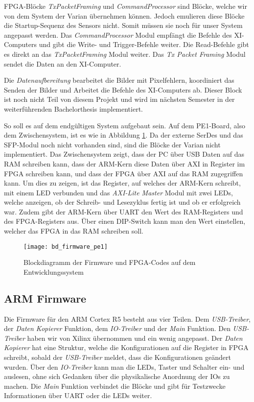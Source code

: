 FPGA-Blöcke \textit{TxPacketFraming} und \textit{CommandProcessor} sind Blöcke, welche wir von dem System der Varian übernehmen können. Jedoch emulieren diese Blöcke die Startup-Sequenz des Sensors nicht. Somit müssen sie noch für unser System angepasst werden. Das \textit{CommandProcessor} Modul empfängt die Befehle des XI-Computers und gibt die Write- und Trigger-Befehle weiter. Die Read-Befehle gibt es direkt an das \textit{TxPacketFraming} Modul weiter. 
Das \textit{Tx Packet Framing} Modul sendet die Daten an den XI-Computer.

Die \textit{Datenaufbereitung} bearbeitet die Bilder mit Pixelfehlern, koordiniert das Senden der Bilder und Arbeitet die Befehle des XI-Computers ab. Dieser Block ist noch nicht Teil von diesem Projekt und wird im nächsten Semester in der weiterführenden Bachelorthesis implementiert.

So soll es auf dem endgültigen System aufgebaut sein. Auf dem PE1-Board, also dem Zwischensystem, ist es wie in Abbildung \ref{fig:bd_firmware_pe1}. Da der externe SerDes und das SFP-Modul noch nicht vorhanden sind, sind die Blöcke der Varian nicht implementiert. Das Zwischensystem zeigt, dass der PC über USB Daten auf das RAM schreiben kann, dass der ARM-Kern diese Daten über AXI in Register im FPGA schreiben kann, und dass der FPGA über AXI auf das RAM zugegriffen kann. Um dies zu zeigen, ist das Register, auf welches der ARM-Kern schreibt, mit einem LED verbunden und das \textit{AXI-Lite Master} Modul mit zwei LEDs, welche anzeigen, ob der Schreib- und Lesezyklus fertig ist und ob er erfolgreich war. Zudem gibt der ARM-Kern über UART den Wert des RAM-Registers und des FPGA-Registers aus. Über einen DIP-Switch kann man den Wert einstellen, welcher das FPGA in das RAM schreiben soll. 

\begin{figure}[tb]
    \centering
    \texttt{[image: bd\_firmware\_pe1]}
    \caption{Blockdiagramm der Firmware und FPGA-Codes auf dem Entwicklungssystem}
    \label{fig:bd_firmware_pe1}
\end{figure}

\subsection{ARM Firmware}
Die Firmware für den ARM Cortex R5 besteht aus vier Teilen. Dem \textit{USB-Treiber}, der \textit{Daten Kopierer} Funktion, dem \textit{IO-Treiber} und der \textit{Main} Funktion. Den \textit{USB-Treiber} haben wir von Xilinx übernommen und ein wenig angepasst. Der \textit{Daten Kopierer} hat eine Struktur, welche die Konfigurationen auf die Register in FPGA schreibt, sobald der \textit{USB-Treiber} meldet, dass die Konfigurationen geändert wurden. Über den \textit{IO-Treiber} kann man die LEDs, Taster und Schalter ein- und auslesen, ohne sich Gedanken über die physikalische Anordnung der IOs zu machen. Die \textit{Main} Funktion verbindet die Blöcke und gibt für Testzwecke Informationen über UART oder die LEDs weiter.

